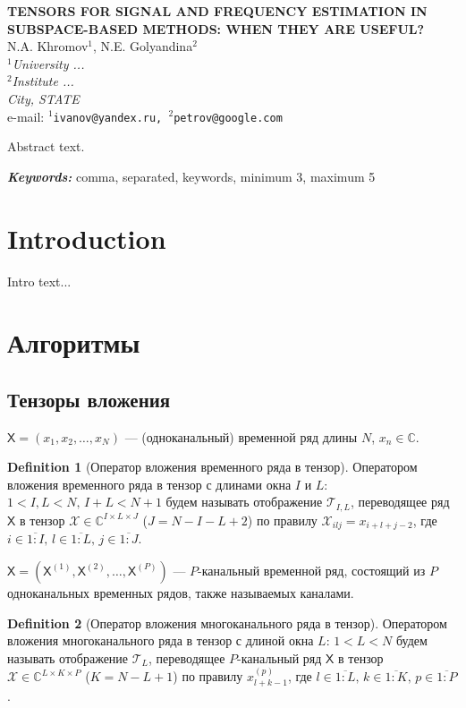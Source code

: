 \documentclass[12pt]{article}
\providecommand{\keywords}[1]
{
  \vspace{2mm}\hspace{20pt}\textbf{\textit{Keywords:}} #1
}
\providecommand{\abskeyw}[2]
{
  \begin{small}
    \begin{adjustwidth}{10mm}{10mm}
      \vspace{1mm}\hspace{20pt}#1

      \keywords{#2}
    \end{adjustwidth}
  \end{small}
}
\newcommand{\tX}{\mathsf{X}}
\newcommand{\calX}{\mathcal{X}}
\newcommand{\calT}{\mathcal{T}}
\theoremstyle{definition}
\newtheorem{definition}{Definition}
\theoremstyle{remark}
\begin{document}
\begin{center}
  {\Large\bf TENSORS FOR SIGNAL AND FREQUENCY ESTIMATION IN
  SUBSPACE-BASED METHODS: WHEN THEY ARE USEFUL?}\\\vspace{2mm} {\sc N.A.
  Khromov$^1$, N.E. Golyandina$^2$}\\\vspace{2mm}
  {\it $^{1}$University ...\\
    $^{2}$Institute  ...\\
  City, STATE\\} e-mail: {\tt $^1$ivanov@yandex.ru,
  $^2$petrov@google.com}

  \abskeyw{Abstract text.}{comma, separated, keywords, minimum 3,
  maximum 5}
\end{center}

\section{Introduction}

Intro text...

\section{Алгоритмы}
\subsection{Тензоры вложения}
$\tX = (x_1, x_2, \ldots, x_N)$ --- (одноканальный) временной ряд
длины $N$, $x_n \in
\mathbb{C}$.
\begin{definition}[Оператор вложения временного ряда в тензор]
  Оператором вложения временного ряда в тензор с длинами окна $I$ и $L$:
  ${1< I,L < N},\, {I + L < N + 1}$
  будем называть отображение $\calT_{I,L}$, переводящее ряд $\tX$ в
  тензор $\calX \in \mathbb{C}^{I\times L \times J}$ \linebreak
  (${J= N - I - L + 2}$)
  по правилу $\mathcal{X}_{ilj}=x_{i+l+j-2}$, где $i\in \overline{1:I},\, l
  \in\overline{1:L},\, j \in\overline{1:J}$.
\end{definition}

$\tX = (\tX^{(1)}, \tX^{(2)}, \ldots, \tX^{(P)})$ --- $P$-канальный
временной ряд, состоящий из $P$ одноканальных временных рядов, также
называемых каналами.
\begin{definition}[Оператор вложения многоканального ряда в тензор]
  Оператором вложения многоканального ряда в тензор с длиной окна $L$:
  ${1< L < N}$ будем называть отображение $\calT_{L}$, переводящее $P$-канальный
  ряд $\tX$ в тензор $\calX \in \mathbb{C}^{L\times K \times P}$ \linebreak
  (${K = N - L + 1}$)
  по правилу $x_{l+k-1}^{(p)}$, где $l \in \overline{1:L},\, k \in
  \overline{1:K},\, p \in \overline{1:P}$.
\end{definition}
\end{document}
